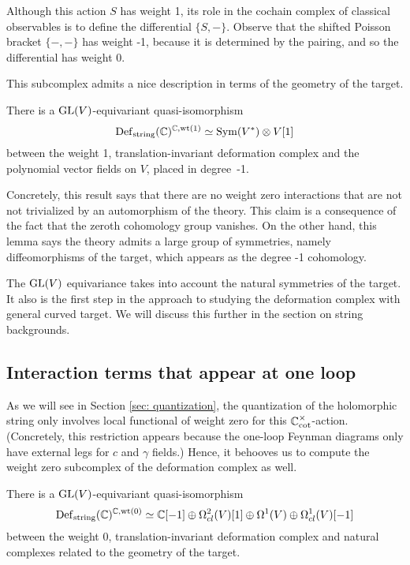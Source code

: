 \begin{rmk}\label{rmk: classical weights}
Although this action $S$ has weight 1, 
its role in the cochain complex of classical observables is to define the differential $\{S,-\}$.
Observe that the shifted Poisson bracket $\{-,-\}$ has weight -1, 
because it is determined by the pairing, 
and so the differential has weight 0. 
\end{rmk}

This subcomplex admits a nice description in terms of the geometry of the target.

\def\wt{{\rm wt}}

\begin{lem}
\label{lem: def complex wt zero} 
There is a ${\rm GL}(V)$-equivariant quasi-isomorphism
\[
\Def_{\rm string}(\CC)^{\CC, \wt(1)} \simeq \Sym(V^*) \tensor V[1]
\]
between the weight 1, translation-invariant deformation complex 
and the polynomial vector fields on $V$, placed in degree~-1.
\end{lem}

Concretely, this result says that there are no weight zero interactions that are not not trivialized by an automorphism of the theory.
This claim is a consequence of the fact that the zeroth cohomology group vanishes.
On the other hand, this lemma says the theory admits a large group of symmetries,
namely diffeomorphisms of the target, 
which appears as the degree -1 cohomology.

The ${\rm GL}(V)$ equivariance takes into account the natural symmetries of the target. 
It also is the first step in the approach to studying the deformation complex with general curved target. 
We will discuss this further in the section on string backgrounds. 

\subsection{Interaction terms that appear at one loop}

As we will see in Section \ref{sec: quantization}, 
the quantization of the holomorphic string only involves local functional of weight zero for this $\mathbb C^\times_{\rm cot}$-action.
(Concretely, this restriction appears because the one-loop Feynman diagrams only have external legs for $c$ and $\gamma$ fields.)
Hence, it behooves us to compute the weight zero subcomplex of the deformation complex as well.

\begin{lem}
\label{lem: def complex wt zero} 
There is a ${\rm GL}(V)$-equivariant quasi-isomorphism
\[
\Def_{\rm string}(\CC)^{\CC, \wt(0)} \simeq \CC[-1] \oplus \Omega^2_{cl}(V)[1] \oplus \Omega^1(V) \oplus \Omega^1_{cl}(V)[-1] 
\]
between the weight 0, translation-invariant deformation complex 
and natural complexes related to the geometry of the target.
\end{lem}

